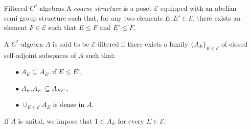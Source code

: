 
\begin{frame}{Filtered $C^*$-algebras}	
A \textit{coarse structure} \cite{DellAieraThesis} is a poset $\mathcal E$ equipped with an abelian semi group structure such that, for any two elements $E,E'\in \mathcal E$, there exists an element $F\in \mathcal E$ such that $E\leq F$ and $E'\leq F$. \\

\begin{definition}
A $C^*$-algebra $A$ is said to be $\mathcal E$-filtered if there exists a family $\{A_E \}_{E\in \mathcal E}$ of closed self-adjoint subspaces of $A$ such that:
\begin{itemize}
\item[$\bullet$] $A_E \subseteq A_{E'}$ if $E\leq E'$,
\item[$\bullet$] $A_E . A_{E'} \subseteq A_{EE'}$,
\item[$\bullet$] $\cup_{E\in \mathcal E} A_E$ is dense in $A$.
\end{itemize} 
If $A$ is unital, we impose that $1\in A_E$ for every $E\in \mathcal E$.
\end{definition}
\end{frame}
